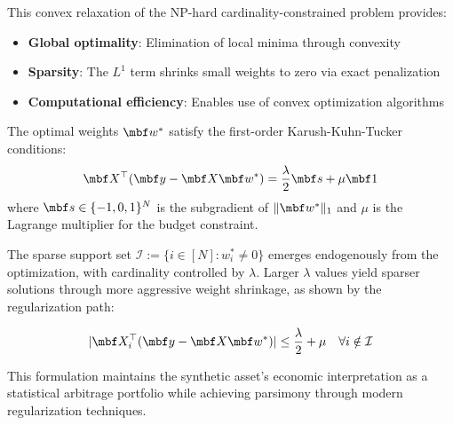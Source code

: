 This convex relaxation of the NP-hard cardinality-constrained problem provides:
\begin{itemize}
\item \textbf{Global optimality}: Elimination of local minima through convexity
\item \textbf{Sparsity}: The $L^1$ term shrinks small weights to zero via exact penalization
\item \textbf{Computational efficiency}: Enables use of convex optimization algorithms
\end{itemize}

The optimal weights $\mbf w^*$ satisfy the first-order Karush-Kuhn-Tucker conditions:
\begin{equation*}
\mbf X^\top(\mbf y - \mbf X\mbf w^*) = \frac{\lambda}{2}\mbf s + \mu\mbf 1
\end{equation*}
where $\mbf s \in \{-1,0,1\}^N$ is the subgradient of $\|\mbf w^*\|_1$ and $\mu$ is the Lagrange multiplier for the budget constraint.

The sparse support set $\mathcal{I} := \{i \in [N] : w_i^* \neq 0\}$ emerges endogenously from the optimization, with cardinality controlled by $\lambda$. Larger $\lambda$ values yield sparser solutions through more aggressive weight shrinkage, as shown by the regularization path:

\begin{equation*}
|\mbf X_i^\top(\mbf y - \mbf X\mbf w^*)| \leq \frac{\lambda}{2} + \mu \quad \forall i \notin \mathcal{I}
\end{equation*}

This formulation maintains the synthetic asset's economic interpretation as a statistical arbitrage portfolio while achieving parsimony through modern regularization techniques.
